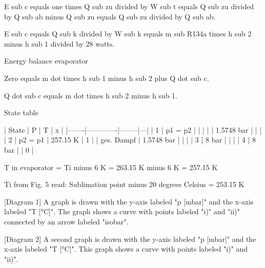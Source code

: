 E sub c equals one times Q sub zu divided by W sub t equals Q sub zu divided by Q sub ab minus Q sub zu equals Q sub zu divided by Q sub ab.

E sub c equals Q sub k divided by W sub k equals m sub R134a times h sub 2 minus h sub 1 divided by 28 watts.

Energy balance evaporator

Zero equals m dot times h sub 1 minus h sub 2 plus Q dot sub c.

Q dot sub c equals m dot times h sub 2 minus h sub 1.

State table

| State | P           | T      | x |
|-------|-------------|--------|---|
| 1     | p1 = p2     |        |   |
|       | 1.5748 bar  |        |   |
| 2     | p2 = p1     | 257.15 K | 1 |
| ges. Dampf | 1.5748 bar | |   |
| 3     | 8 bar       |        |   |
| 4     | 8 bar       |        | 0 |

T in evaporator = Ti minus 6 K = 263.15 K minus 6 K = 257.15 K

Ti from Fig. 5 read: Sublimation point minus 20 degrees Celsius = 253.15 K

[Diagram 1]
A graph is drawn with the y-axis labeled "p [mbar]" and the x-axis labeled "T [°C]". The graph shows a curve with points labeled "i)" and "ii)" connected by an arrow labeled "isobar".

[Diagram 2]
A second graph is drawn with the y-axis labeled "p [mbar]" and the x-axis labeled "T [°C]". This graph shows a curve with points labeled "i)" and "ii)".